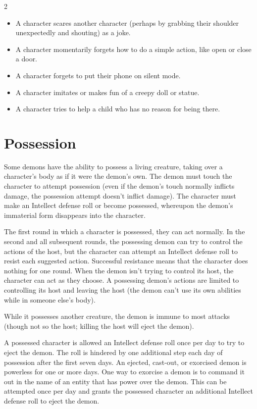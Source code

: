 \begin{multicols}{2}
\begin{itemize}
\item A character scares another character (perhaps by grabbing their shoulder unexpectedly and shouting) as a joke.
\item A character momentarily forgets how to do a simple action, like open or close a door.
\item A character forgets to put their phone on silent mode. 
\item A character imitates or makes fun of a creepy doll or statue.
\item A character tries to help a child who has no reason for being there.
\end{itemize}

\section{Possession}

Some demons have the ability to possess a living creature, taking over a character’s body as if it were the demon’s own. The demon must touch the character to attempt possession (even if the demon’s touch normally inflicts damage, the possession attempt doesn’t inflict damage). The character must make an Intellect defense roll or become possessed, whereupon the demon’s immaterial form disappears into the character.

The first round in which a character is possessed, they can act normally. In the second and all subsequent rounds, the possessing demon can try to control the actions of the host, but the character can attempt an Intellect defense roll to resist each suggested action. Successful resistance means that the character does nothing for one round. When the demon isn’t trying to control its host, the character can act as they choose. A possessing demon’s actions are limited to controlling its host and leaving the host (the demon can’t use its own abilities while in someone else’s body).

While it possesses another creature, the demon is immune to most attacks (though not so the host; killing the host will eject the demon).

A possessed character is allowed an Intellect defense roll once per day to try to eject the demon. The roll is hindered by one additional step each day of possession after the first seven days. An ejected, cast-out, or exorcised demon is powerless for one or more days. One way to exorcise a demon is to command it out in the name of an entity that has power over the demon. This can be attempted once per day and grants the possessed character an additional Intellect defense roll to eject the demon.


\end{multicols}
